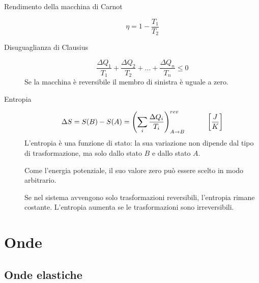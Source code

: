 \documentclass[a4paper,11pt,italian]{article}
\begin{document}
\begin{description}
  \item[Rendimento della macchina di Carnot] 
  \[ \eta = 1 - \frac{T_1}{T_2} \]

  \item[Disuguaglianza di Clausius] 
  \[ \frac{\Delta Q_1}{T_1} + \frac{\Delta Q_2}{T_2} + ... + \frac{\Delta Q_n}{T_n} \leq 0  \]
  Se la macchina è reversibile il membro di sinistra è uguale a zero.

  \item[Entropia]
  \[ \Delta S = S(B) - S(A) = \left( \sum_i \frac{\Delta Q_i}{T_i} \right)^{rev}_{A \rightarrow B} \hspace*{3em} \left[ \frac{J}{K} \right]\]
  L'entropia è una funzione di stato: la sua variazione non dipende dal tipo di trasformazione, ma solo dallo stato $ B $ e dallo stato $ A $.
  
  Come l'energia potenziale, il suo valore zero può essere scelto in modo arbitrario.
  
  Se nel sistema avvengono solo trasformazioni reversibili, l'entropia rimane costante. L'entropia aumenta se le trasformazioni sono irreversibili.

\end{description}


\newpage
\section{Onde}

\subsection{Onde elastiche}
\end{document}

